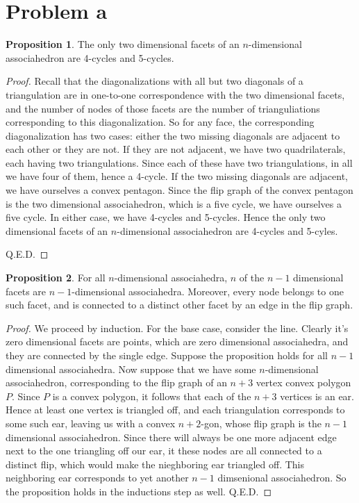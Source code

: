 \documentclass[12pt]{article}
\theoremstyle{definition}
\newtheorem{proposition}{Proposition}
\begin{document}
\section{Problem a}

\begin{proposition}
The only two dimensional facets of an $n$-dimensional associahedron are 4-cycles and 5-cycles.
\end{proposition}

\begin{proof}
Recall that the diagonalizations with all but two diagonals of a triangulation are in one-to-one correspondence with the two dimensional facets, and the number of nodes of those facets are the number of trianguliations corresponding to this diagonalization. So for any face, the corresponding diagonalization has two cases: either the two missing diagonals are adjacent to each other or they are not. If they are not adjacent, we have two quadrilaterals, each having two triangulations. Since each of these have two triangulations, in all we have four of them, hence a 4-cycle. If the two missing diagonals are adjacent, we have ourselves a convex pentagon. Since the flip graph of the convex pentagon is the two dimensional associahedron, which is a five cycle, we have ourselves a five cycle. In either case, we have 4-cycles and 5-cycles. Hence the only two dimensional facets of an $n$-dimensional associahedron are 4-cycles and 5-cyles. 

Q.E.D.


\end{proof}

\begin{proposition}
For all $n$-dimensional associahedra, $n$ of the $n-1$ dimensional facets are $n-1$-dimensional associahedra. Moreover, every node belongs to one such facet, and is connected to a distinct other facet by an edge in the flip graph.
\end{proposition}

\begin{proof}
We proceed by induction. For the base case, consider the line. Clearly it's zero dimensional facets are points, which are zero dimensional associahedra, and they are connected by the single edge. Suppose the proposition holds for all $n-1$ dimensional associahedra. Now suppose that we have some $n$-dimensional associahedron, corresponding to the flip graph of an $n+3$ vertex convex polygon $P$. Since $P$ is a convex polygon, it follows that each of the $n+3$ vertices is an ear. Hence at least one vertex is triangled off, and each triangulation corresponds to some such ear, leaving us with a convex $n+2$-gon, whose flip graph is the $n-1$ dimensional associahedron. Since there will always be one more adjacent edge next to the one triangling off our ear, it these nodes are all connected to a distinct flip, which would make the nieghboring ear triangled off. This neighboring ear corresponds to yet another $n-1$ dimsenional associahedron. So the proposition holds in the inductions step as well. 
Q.E.D.
\end{proof}
\end{document}
